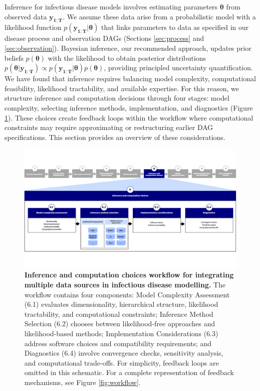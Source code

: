 \documentclass{article}
\begin{document}
Inference for infectious disease models involves estimating parameters $\boldsymbol{\theta}$ from observed data $\boldsymbol{y_{1:T}}$.
We assume these data arise from a probabilistic model with a likelihood function $p(\boldsymbol{y_{1:T}} |
  \boldsymbol{\theta})$ that links parameters to data as specified in our disease process and observation \ac{DAG}s (Sections \ref{sec:process} and \ref{sec:observation}).
Bayesian inference, our recommended approach, updates prior beliefs $p(\boldsymbol{\theta})$ with the likelihood to obtain posterior distributions $p(\boldsymbol{\theta} | \boldsymbol{y_{1:T}}) \propto p(\boldsymbol{y_{1:T}}|\boldsymbol{\theta}) p(\boldsymbol{\theta})$, providing principled uncertainty quantification.
We have found that inference requires balancing model complexity, computational feasibility, likelihood tractability, and available expertise.
For this reason, we structure inference and computation decisions through four stages: model complexity, selecting inference methods, implementation, and diagnostics (Figure \ref{fig:fitting}). 
These choices create feedback loops within the workflow where computational constraints may require approximating or restructuring earlier \ac{DAG} specifications.
This section provides an overview of these considerations.

\begin{figure}[htbp]
    \centering
    \includegraphics[width=\textwidth]{figures/Abbott et al figure 3.png}
    \caption{\textbf{Inference and computation choices workflow for integrating multiple data sources in infectious disease modelling.} The workflow contains four components: Model Complexity Assessment (6.1) evaluates dimensionality, hierarchical structure, likelihood tractability, and computational constraints; Inference Method Selection (6.2) chooses between likelihood-free approaches and likelihood-based methods; Implementation Considerations (6.3) address software choices and compatibility requirements; and Diagnostics (6.4) involve convergence checks, sensitivity analysis, and computational trade-offs. For simplicity, feedback loops are omitted in this schematic. For a complete representation of feedback mechanisms, see Figure \ref{fig:workflow}.}
    \label{fig:fitting}
\end{figure}
\end{document}
